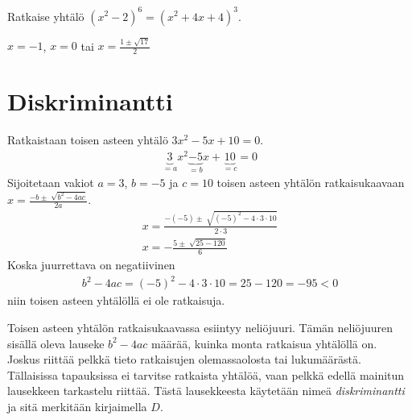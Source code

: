 \begin{tehtava} %
	Ratkaise yhtälö $(x^2-2)^6=(x^2+4x+4)^3$.
	\begin{vastaus}
		$x=-1$, $x=0$ tai $x=\frac{1 \pm \sqrt{17}}{2}$
	\end{vastaus}
\end{tehtava}


\section{Diskriminantti}


\begin{esimerkki}
    Ratkaistaan toisen asteen yhtälö $3x^2-5x+10=0$.
    \begin{align*}
        \underbrace{3}_{=a}x^2\underbrace{-5}_{=b}x+\underbrace{10}_{=c}=0
    \end{align*}
    Sijoitetaan vakiot $a=3$, $b=-5$ ja $c=10$ toisen asteen yhtälön ratkaisukaavaan $x=\frac{-b \pm \sqrt[]{b^2-4ac}}{2a}$.
    \begin{align*}
        x=\frac{-(-5) \pm \sqrt[]{(-5)^2-4\cdot 3 \cdot 10}}{2 \cdot 3} \\
        x=-\frac{5 \pm \sqrt[]{25-120}}{6}
    \end{align*}
    Koska juurrettava on negatiivinen
    \begin{align*}
        b^2-4ac=(-5)^2-4 \cdot 3 \cdot 10=25-120=-95<0
    \end{align*}
    niin toisen asteen yhtälöllä ei ole ratkaisuja.
\end{esimerkki}


Toisen asteen yhtälön ratkaisukaavassa esiintyy neliöjuuri. Tämän neliöjuuren sisällä oleva lauseke $b^2-4ac$ määrää, kuinka monta ratkaisua yhtälöllä on. Joskus riittää pelkkä tieto ratkaisujen olemassaolosta tai lukumäärästä. Tällaisissa tapauksissa ei tarvitse ratkaista yhtälöä, vaan pelkkä edellä mainitun lausekkeen tarkastelu riittää. Tästä lausekkeesta käytetään nimeä \emph{diskriminantti} ja sitä merkitään kirjaimella $D$.



